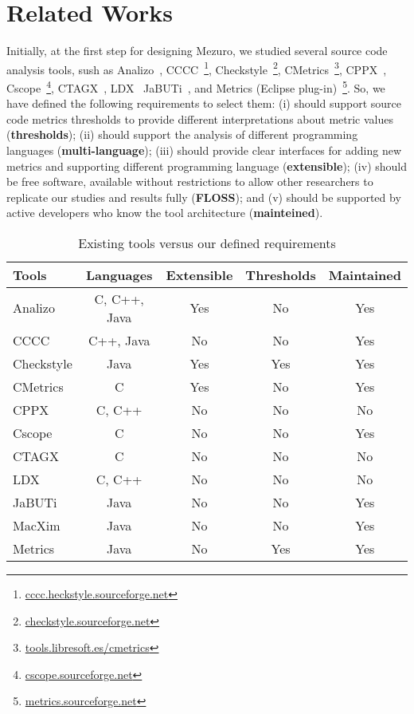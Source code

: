 \section{Related Works}
\label{sec:related_works}

Initially, at the first step for designing Mezuro, we studied several source
code analysis tools, sush as
%
Analizo~\cite{analizo}, CCCC~\footnote{\url{cccc.heckstyle.sourceforge.net}},
Checkstyle~\footnote{\url{checkstyle.sourceforge.net}},
CMetrics~\footnote{\url{tools.libresoft.es/cmetrics}}, CPPX~\cite{hassan2005},
Cscope~\footnote{\url{cscope.sourceforge.net}}, CTAGX~\cite{hassan2005},
LDX~\cite{hassan2005} JaBUTi~\cite{jabuti}, and Metrics (Eclipse
plug-in)~\footnote{\url{metrics.sourceforge.net}}.
%
So, we have defined the following requirements to select them: (i) should
support source code metrics thresholds to provide different interpretations
about metric values (\textbf{thresholds}); (ii) should support the analysis of different programming
languages (\textbf{multi-language}); (iii) should provide clear interfaces for adding new metrics and
supporting different programming language (\textbf{extensible}); (iv) should be free software,
available without restrictions to allow other researchers to replicate our
studies and results fully (\textbf{FLOSS}); and (v) should be supported by active developers who
know the tool architecture (\textbf{mainteined}).
 
\begin{table}[htb]
  \centering
{}
  \begin{tabular}{|l|c|c|c|c|}
    \hline
    \textbf{Tools} &
    \textbf{Languages} & %
    \textbf{Extensible} & %
    \textbf{Thresholds} & %
    \textbf{Maintained} \\\hline\hline %
				    
    Analizo 	& C, C++, Java & Yes & No  & Yes    \\\hline
    CCCC 	& C++, Java    & No  & No  & Yes    \\\hline
    Checkstyle	& Java         & Yes  & Yes & Yes    \\\hline
    CMetrics	& C            & Yes & No  & Yes    \\\hline
    CPPX	& C, C++       & No  & No  & No     \\\hline
    Cscope	& C            & No  & No  & Yes    \\\hline
    CTAGX	& C            & No  & No  & No     \\\hline
    LDX		& C, C++       & No  & No  & No     \\\hline
    JaBUTi	& Java         & No  & No  & Yes    \\\hline
    MacXim	& Java         & No  & No  & Yes    \\\hline
    Metrics 	& Java         & No  & Yes & Yes    \\\hline
    
  \end{tabular}
  \caption{Existing tools versus our defined requirements}
  \label{tab:tools}
\end{table}

